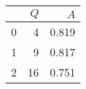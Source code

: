 \begin{tabular}{lrr}
\toprule
{} &  $Q$ &    $A$ \\
\midrule
0 &    4 &  0.819 \\
1 &    9 &  0.817 \\
2 &   16 &  0.751 \\
\bottomrule
\end{tabular}
